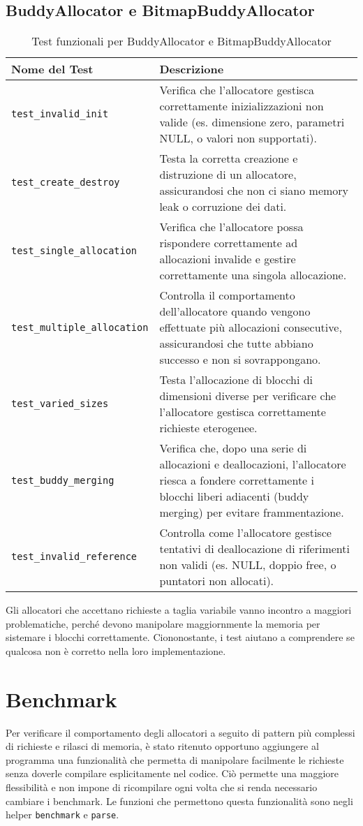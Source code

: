 \subsection{BuddyAllocator e BitmapBuddyAllocator}
\begin{table}[H]
\centering
\begin{tabularx}{\textwidth}{|l|X|}
\hline
\textbf{Nome del Test} & \textbf{Descrizione} \\
\hline
\texttt{test\_invalid\_init} & Verifica che l'allocatore gestisca correttamente inizializzazioni non valide (es. dimensione zero, parametri NULL, o valori non supportati). \\
\hline
\texttt{test\_create\_destroy} & Testa la corretta creazione e distruzione di un allocatore, assicurandosi che non ci siano memory leak o corruzione dei dati. \\
\hline
\texttt{test\_single\_allocation} & Verifica che l'allocatore possa rispondere correttamente ad allocazioni invalide e gestire correttamente una singola allocazione. \\
\hline
\texttt{test\_multiple\_allocation} & Controlla il comportamento dell'allocatore quando vengono effettuate più allocazioni consecutive, assicurandosi che tutte abbiano successo e non si sovrappongano. \\
\hline
\texttt{test\_varied\_sizes} & Testa l'allocazione di blocchi di dimensioni diverse per verificare che l'allocatore gestisca correttamente richieste eterogenee. \\
\hline
\texttt{test\_buddy\_merging} & Verifica che, dopo una serie di allocazioni e deallocazioni, l'allocatore riesca a fondere correttamente i blocchi liberi adiacenti (buddy merging) per evitare frammentazione. \\
\hline
\texttt{test\_invalid\_reference} & Controlla come l'allocatore gestisce tentativi di deallocazione di riferimenti non validi (es. NULL, doppio free, o puntatori non allocati). \\
\hline
\end{tabularx}
\caption{Test funzionali per BuddyAllocator e BitmapBuddyAllocator}
\end{table}

Gli allocatori che accettano richieste a taglia variabile vanno incontro a maggiori problematiche, perché devono manipolare maggiornmente la memoria per sistemare i blocchi correttamente. Ciononostante, i test aiutano a comprendere se qualcosa non è corretto nella loro implementazione.


\section{Benchmark}
Per verificare il comportamento degli allocatori a seguito di pattern più complessi di richieste e rilasci di memoria, è stato ritenuto opportuno aggiungere al programma una funzionalità che permetta di manipolare facilmente le richieste senza doverle compilare esplicitamente nel codice. Ciò permette una maggiore flessibilità e non impone di ricompilare ogni volta che si renda necessario cambiare i benchmark. Le funzioni che permettono questa funzionalità sono negli helper \texttt{benchmark} e \texttt{parse}.

